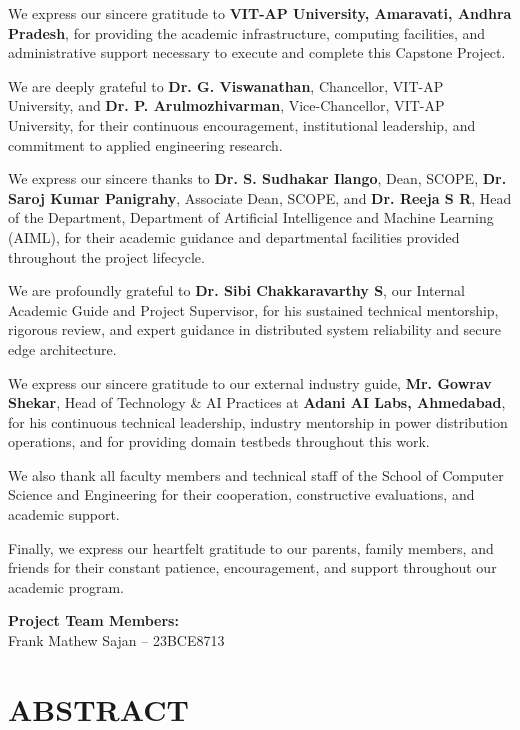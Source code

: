 \documentclass[12pt,a4paper,oneside]{report}
\begin{document}
We express our sincere gratitude to \textbf{VIT-AP University, Amaravati, Andhra Pradesh}, for providing the academic infrastructure, computing facilities, and administrative support necessary to execute and complete this Capstone Project.

We are deeply grateful to \textbf{Dr. G. Viswanathan}, Chancellor, VIT-AP University, and \textbf{Dr. P. Arulmozhivarman}, Vice-Chancellor, VIT-AP University, for their continuous encouragement, institutional leadership, and commitment to applied engineering research.

We express our sincere thanks to \textbf{Dr. S. Sudhakar Ilango}, Dean, SCOPE, \textbf{Dr. Saroj Kumar Panigrahy}, Associate Dean, SCOPE, and \textbf{Dr. Reeja S R}, Head of the Department, Department of Artificial Intelligence and Machine Learning (AIML), for their academic guidance and departmental facilities provided throughout the project lifecycle.

We are profoundly grateful to \textbf{Dr. Sibi Chakkaravarthy S}, our Internal Academic Guide and Project Supervisor, for his sustained technical mentorship, rigorous review, and expert guidance in distributed system reliability and secure edge architecture.

We express our sincere gratitude to our external industry guide, \textbf{Mr. Gowrav Shekar}, Head of Technology \& AI Practices at \textbf{Adani AI Labs, Ahmedabad}, for his continuous technical leadership, industry mentorship in power distribution operations, and for providing domain testbeds throughout this work.

We also thank all faculty members and technical staff of the School of Computer Science and Engineering for their cooperation, constructive evaluations, and academic support.

Finally, we express our heartfelt gratitude to our parents, family members, and friends for their constant patience, encouragement, and support throughout our academic program.

\vspace{0.8cm}
\noindent
\textbf{Project Team Members:} \\
Frank Mathew Sajan -- 23BCE8713

\clearpage

\chapter*{ABSTRACT}
\thispagestyle{plain}
\end{document}
